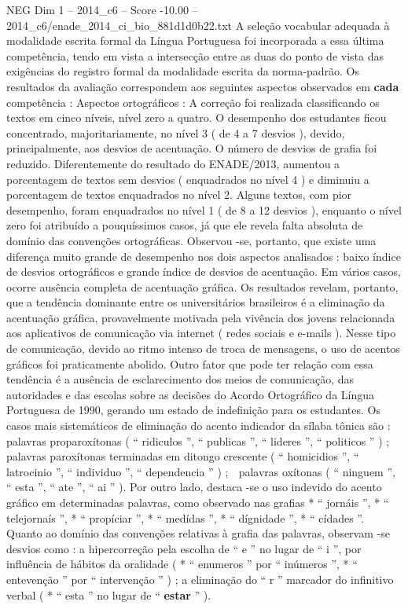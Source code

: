 \begin{textsample}{NEG Dim 1 – 2014\_c6 – Score -10.00 – 2014\_c6/enade\_2014\_ci\_bio\_881d1d0b22.txt}
A seleção vocabular adequada à modalidade escrita formal da Língua Portuguesa foi incorporada a essa última competência, tendo em vista a intersecção entre as duas do ponto de vista das exigências do registro formal da modalidade escrita da norma-padrão.
Os resultados da avaliação correspondem aos seguintes aspectos observados em \textbf{cada} competência : Aspectos ortográficos : A correção foi realizada classificando os textos em cinco níveis, nível zero a quatro.
O desempenho dos estudantes ficou concentrado, majoritariamente, no nível 3 ( de 4 a 7 desvios ), devido, principalmente, aos desvios de acentuação.
O número de desvios de grafia foi reduzido.
Diferentemente do resultado do ENADE/2013, aumentou a porcentagem de textos sem desvios ( enquadrados no nível 4 ) e diminuiu a porcentagem de textos enquadrados no nível 2.
Alguns textos, com pior desempenho, foram enquadrados no nível 1 ( de 8 a 12 desvios ), enquanto o nível zero foi atribuído a pouquíssimos casos, já que ele revela falta absoluta de domínio das convenções ortográficas.
Observou -se, portanto, que existe uma diferença muito grande de desempenho nos dois aspectos analisados : baixo índice de desvios ortográficos e grande índice de desvios de acentuação.
Em vários casos, ocorre ausência completa de acentuação gráfica.
Os resultados revelam, portanto, que a tendência dominante entre os universitários brasileiros é a eliminação da acentuação gráfica, provavelmente motivada pela vivência dos jovens relacionada aos aplicativos de comunicação via internet ( redes sociais e e-mails ).
Nesse tipo de comunicação, devido ao ritmo intenso de troca de mensagens, o uso de acentos gráficos foi praticamente abolido.
Outro fator que pode ter relação com essa tendência é a ausência de esclarecimento dos meios de comunicação, das autoridades e das escolas sobre as decisões do Acordo Ortográfico da Língua Portuguesa de 1990, gerando um estado de indefinição para os estudantes.
Os casos mais sistemáticos de eliminação do acento indicador da sílaba tônica são :  palavras proparoxítonas ( “ ridiculos ”, “ publicas ”, “ lideres ”, “ politicos ” ) ;  palavras paroxítonas terminadas em ditongo crescente ( “ homicidios ”, “ latrocinio ”, “ individuo ”, “ dependencia ” ) ;  palavras oxítonas ( “ ninguem ”, “ esta ”, “ ate ”, “ ai ” ).
Por outro lado, destaca -se o uso indevido do acento gráfico em determinadas palavras, como observado nas grafias * “ jornáis ”, * “ telejornaís ”, * “ propíciar ”, * “ medídas ”, * “ dígnidade ”, * “ cídades ”.
Quanto ao domínio das convenções relativas à grafia das palavras, observam -se desvios como : a hipercorreção pela escolha de “ e ” no lugar de “ i ”, por influência de hábitos da oralidade ( * “ enumeros ” por “ inúmeros ”, * “ entevenção ” por “ intervenção ” ) ; a eliminação do “ r ” marcador do infinitivo verbal ( * “ esta ” no lugar de “ \textbf{estar} ” ).

\end{textsample}
